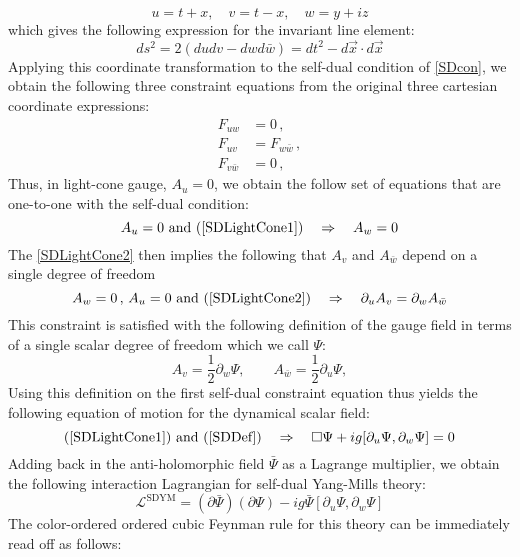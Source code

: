 \documentclass[11pt,letter]{article}
\def\be{\begin{equation}}
\begin{document}
\begin{equation}
u = t+x,\quad v=t-x, \quad w = y+iz
\end{equation}
which gives the following expression for the invariant line element:
\begin{equation}
ds^2 = 2(dudv - dwd\bar{w}) = dt^2 - d\vec{x}\cdot d\vec{x}
\end{equation}
Applying this coordinate transformation to the self-dual condition of \cref{SDcon}, we obtain the following three constraint equations from the original three cartesian coordinate expressions:
\begin{align} \label{SDLightCone1}
F_{uw} &=0\,,
\\
 \label{SDLightCone2}
 F_{uv} &= F_{w\bar{w}}\,,
\\
 \label{SDLightCone3}
 F_{v\bar{w}} &= 0\,,
\end{align}
Thus, in light-cone gauge, $A_u=0$, we obtain the follow set of equations that are one-to-one with the self-dual condition:
\begin{equation}
A_u=0 \text{ and } (\ref{SDLightCone1}) \quad\Rightarrow \quad A_w=0
\end{equation}
The \cref{SDLightCone2} then implies the following that $A_v$ and $A_{\bar{w}}$ depend on a single degree of freedom
\begin{equation}
A_w=0\,,\,A_u=0 \text{ and } (\ref{SDLightCone2}) \quad\Rightarrow \quad \partial_u A_v = \partial_w A_{\bar{w}}
\end{equation}
This constraint is  satisfied with the following definition of the gauge field in terms of a single scalar degree of freedom which we call $\Psi$:
\be\label{SDDef}
A_v = \frac{1}{2} \partial_w \Psi, \qquad A_{\bar{w}} = \frac{1}{2} \partial_u \Psi,
\end{equation}
Using this definition on the first self-dual constraint equation thus yields the following equation of motion for the dynamical scalar field:
\be\label{SDEOM}
(\ref{SDLightCone1}) \text{ and } (\ref{SDDef}) \quad  \Rightarrow\quad \Box \Psi + ig [\partial_u \Psi, \partial_w \Psi ]=0
\end{equation}
Adding back in the anti-holomorphic field $\bar{\Psi}$ as a Lagrange multiplier, we obtain the following interaction Lagrangian for self-dual Yang-Mills theory:
\begin{equation}
\mathcal{L}^{\text{SDYM}} = (\partial \bar{\Psi})(\partial \Psi) -i g \bar{\Psi} [\partial_u \Psi, \partial_w \Psi ]
\end{equation}
The color-ordered ordered cubic Feynman rule for this theory can be immediately read off as follows:
\end{document}
